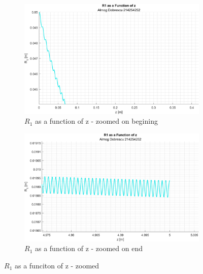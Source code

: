 \documentclass[11pt, a4paper]{article}
\begin{document}
\begin{figure}[H]
    \centering
    \begin{subfigure}[c]{0.49\textwidth}
        \centering
        \includegraphics[width=\textwidth]{images/graph2.1.png}
        \caption{$R_1$ as a function of z - zoomed on begining}
        \label{fig:R_1_of_z_zoom_on_begining}
    \end{subfigure}
    \begin{subfigure}[c]{0.49\textwidth}
        \centering
        \includegraphics[width=\textwidth]{images/graph2.2.png}
        \caption{$R_1$ as a function of z - zoomed on end}
        \label{fig:R_1_of_z_zoom_on_end}
    \end{subfigure}
    \caption{$R_1$ as a funciton of z - zoomed}
        \label{fig:R_1_of_z_zoom}
\end{figure}

\newpage
\end{document}
